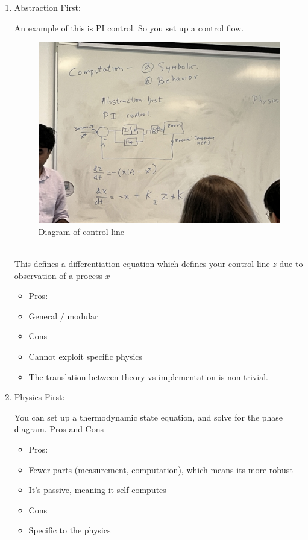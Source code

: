 \begin{enumerate}
	\item Abstraction First:
	
	An example of this is PI control. So you set up a control flow.
	\begin{figure}[h!]
		\centering
		\includegraphics[scale=0.07]{figures/murugan/PI_Control.jpg}
		\caption{Diagram of control line}
	\end{figure}\\
	This defines a differentiation equation which defines your control line $z$ due to observation of a process $x$
	\begin{itemize}
		\item Pros:
			\item General / modular
		\item Cons
			\item Cannot exploit specific physics
			\item The translation between theory vs implementation is non-trivial.
	\end{itemize}
	
	\item Physics First: 
	
	You can set up a thermodynamic state equation, and solve for the phase diagram.
	Pros and Cons
	\begin{itemize}
		\item Pros: 
			\item Fewer parts (measurement, computation), which means its more robust
			\item It's passive, meaning it self computes
		\item Cons
			\item Specific to the physics
	\end{itemize}
\end{enumerate}
